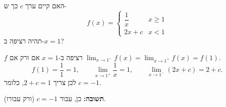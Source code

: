 
\begin{question}
האם קיים ערך $c$ כך ש-
\[
f(x)=\begin{cases}\dfrac1x & x\ge1\\[1ex] 2x+c & x<1\end{cases}
\]
תהיה רציפה ב-$x=1$?
\end{question}

\begin{solution}
$f$ רציפה ב-$x=1$ אם ורק אם $\lim_{x\to1^-}f(x)=\lim_{x\to1^+}f(x)=f(1)$.
\[
f(1)=\frac11=1,\qquad \lim_{x\to1^+}\frac1x=1,\qquad \lim_{x\to1^-}(2x+c)=2+c.
\]
לכן צריך $2+c=1$, כלומר $c=-1$.

\textbf{תשובה:} כן, עבור $c=-1$ (ורק עבורו).
\end{solution}
